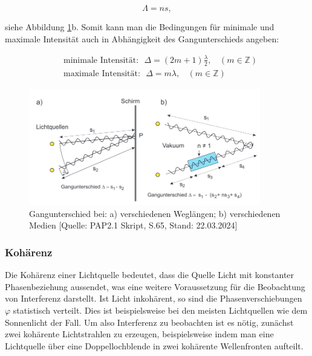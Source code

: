 \documentclass{article}
\begin{document}
\begin{equation}
    \Lambda = n s,
\end{equation}

siehe Abbildung \ref{fig:gangunterschiede}b. Somit kann man die Bedingungen für minimale und maximale Intensität auch in Abhängigkeit des Gangunterschieds angeben:

\begin{equation}
    \begin{split}
        &\text{minimale Intensität:} \ \ \ \Delta = (2m+1) \frac{\lambda}{2}, \ \ \ \ (m \in \mathbb{Z}) \\
        &\text{maximale Intensität:} \ \ \ \Delta = m \lambda, \ \ \ \ (m \in \mathbb{Z})
    \end{split}
\end{equation}

\begin{figure}[!b]
    \centering
    \includegraphics[width=0.9\textwidth]{graphics/skript/gangunterschiede.png}
    \caption{Gangunterschied bei: a) verschiedenen Weglängen; b) verschiedenen Medien [Quelle: PAP2.1 Skript, S.65, Stand: 22.03.2024]}
    \label{fig:gangunterschiede}
\end{figure}




\newpage
\subsubsection{Kohärenz}

Die Kohärenz einer Lichtquelle bedeutet, dass die Quelle Licht mit konstanter Phasenbeziehung aussendet, was eine weitere Voraussetzung für die Beobachtung von Interferenz darstellt. Ist Licht inkohärent, so sind die Phasenverschiebungen $\varphi$ statistisch verteilt. Dies ist beispielsweise bei den meisten Lichtquellen wie dem Sonnenlicht der Fall. Um also Interferenz zu beobachten ist es nötig, zunächst zwei kohärente Lichtstrahlen zu erzeugen, beispielsweise indem man eine Lichtquelle über eine Doppellochblende in zwei kohärente Wellenfronten aufteilt. 
\end{document}
